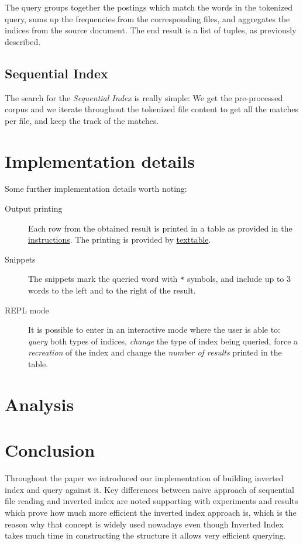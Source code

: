 \documentclass{article}
\begin{document}
The query groups together the postings which match the words in the tokenized query, sums up the frequencies from the corresponding files, and aggregates the indices from the source document. The end result is a list of tuples, as previously described.

\subsection{Sequential Index}
The search for the \textit{Sequential Index} is really simple: We get the pre-processed corpus and we iterate throughout the tokenized file content to get all the matches per file, and keep the track of the matches.

\section{Implementation details}
Some further implementation details worth noting:
\begin{description}
    \item[Output printing] Each row from the obtained result is printed in a table as provided in the \href{http://zitnik.si/teaching/wier/PA3.html}{instructions}. The printing is provided by \href{https://pypi.org/project/texttable/}{texttable}.

    \item[Snippets] The snippets mark the queried word with \texttt{*} symbols, and include up to 3 words to the left and to the right of the result.

    \item[REPL mode] It is possible to enter in an interactive mode where the user is able to: \textit{query} both types of indices, \textit{change} the type of index being queried, force a \textit{recreation} of the index and change the \textit{number of results} printed in the table.
\end{description}

\section{Analysis}


\section{Conclusion}
Throughout the paper we introduced our implementation of building inverted index and query against it. Key differences between naive approach of sequential file reading and inverted index are noted supporting with experiments and results which prove how much more efficient the inverted index approach is, which is the reason why that concept is widely used nowadays even though Inverted Index takes much time in constructing the structure it allows very efficient querying.
\end{document}
